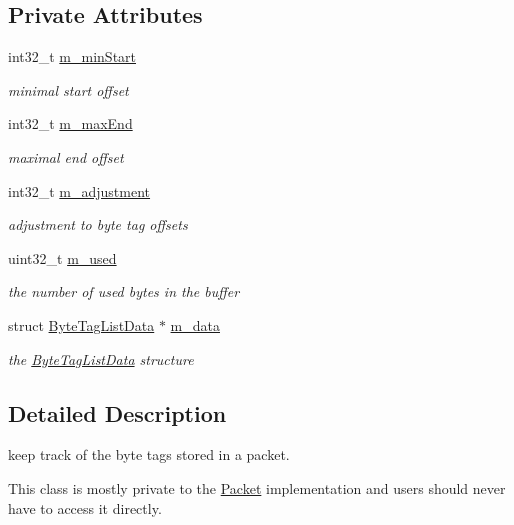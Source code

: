 \subsection*{Private Attributes}
\begin{DoxyCompactItemize}
\item 
int32\+\_\+t \hyperlink{classns3_1_1ByteTagList_a24017961aabc3bcd82344489dbeefcc3}{m\+\_\+min\+Start}
\begin{DoxyCompactList}\small\item\em minimal start offset \end{DoxyCompactList}\item 
int32\+\_\+t \hyperlink{classns3_1_1ByteTagList_ad4387364f261f32cc6bad94bfcee327c}{m\+\_\+max\+End}
\begin{DoxyCompactList}\small\item\em maximal end offset \end{DoxyCompactList}\item 
int32\+\_\+t \hyperlink{classns3_1_1ByteTagList_ab8fc894533bb31b08e75f480f3a284f4}{m\+\_\+adjustment}
\begin{DoxyCompactList}\small\item\em adjustment to byte tag offsets \end{DoxyCompactList}\item 
uint32\+\_\+t \hyperlink{classns3_1_1ByteTagList_a2b9da16dd6ed8ba23f4c604834a48faf}{m\+\_\+used}
\begin{DoxyCompactList}\small\item\em the number of used bytes in the buffer \end{DoxyCompactList}\item 
struct \hyperlink{structns3_1_1ByteTagListData}{Byte\+Tag\+List\+Data} $\ast$ \hyperlink{classns3_1_1ByteTagList_a716851dd71c2fdbf13e4372bf61cde13}{m\+\_\+data}
\begin{DoxyCompactList}\small\item\em the \hyperlink{structns3_1_1ByteTagListData}{Byte\+Tag\+List\+Data} structure \end{DoxyCompactList}\end{DoxyCompactItemize}


\subsection{Detailed Description}
keep track of the byte tags stored in a packet. 

This class is mostly private to the \hyperlink{classns3_1_1Packet}{Packet} implementation and users should never have to access it directly. 

